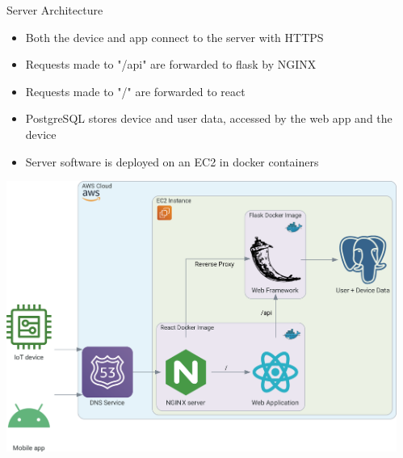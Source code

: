 \documentclass[final, cmyk]{beamer}
\newlength{\sepwidth}
\newlength{\colwidth}
\newcommand{\separatorcolumn}{\begin{column}{\sepwidth}\end{column}}
\begin{document}
\begin{frame}[t]
\begin{columns}[t]
\begin{column}{\colwidth}
      \begin{block}{Server Architecture}
        \begin{itemize}
          \item Both the device and app connect to the server with HTTPS
          \item Requests made to "/api" are forwarded to flask by NGINX
          \item Requests made to "/" are forwarded to react
          \item PostgreSQL stores device and user data, accessed by the web app
            and the device
          \item Server software is deployed on an EC2 in docker containers
        \end{itemize}

        \vskip 0.5cm
        \begin{center}
          \includegraphics[width = 0.95 \textwidth]{data_flow_CMYK.pdf}
        \end{center}
      \end{block}

    \end{column}
    \separatorcolumn

  \end{columns}


\end{frame}
\end{document}

